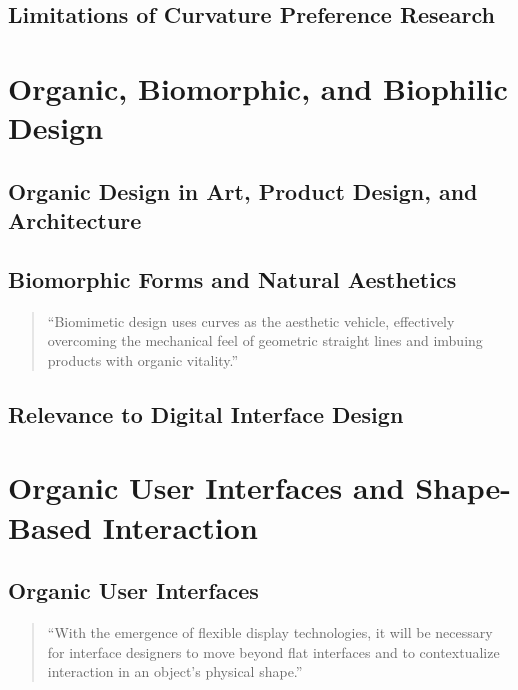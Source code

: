 \subsection{Limitations of Curvature Preference Research}

\section{Organic, Biomorphic, and Biophilic Design}
\subsection{Organic Design in Art, Product Design, and Architecture}

\subsection{Biomorphic Forms and Natural Aesthetics}
\begin{quote}
``Biomimetic design uses curves as the aesthetic vehicle, effectively overcoming the mechanical feel of geometric straight lines and imbuing products with organic vitality.''
\end{quote}
\citep{xiao_research_2025}

\subsection{Relevance to Digital Interface Design}

\section{Organic User Interfaces and Shape-Based Interaction}
\subsection{Organic User Interfaces}
\begin{quote}
``With the emergence of flexible display technologies, it will be necessary for interface designers to move beyond flat interfaces and to contextualize interaction in an object's physical shape.''
\end{quote}
\citep{holman_design_2013}

